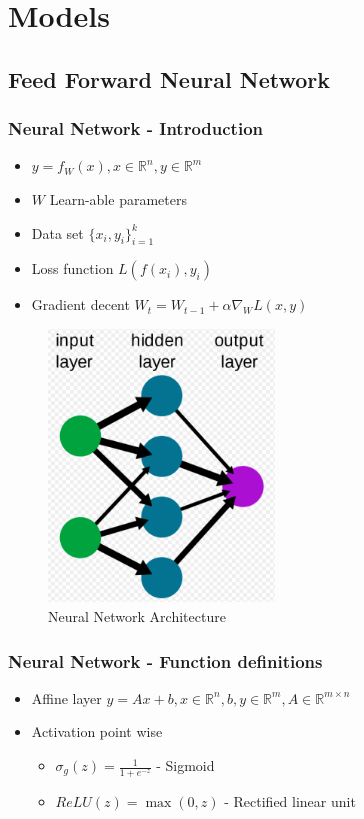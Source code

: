 \documentclass[12pt]{report}
\begin{document}
\section{Models}
\subsection{Feed Forward Neural Network}

\subsubsection{Neural Network - Introduction}
\begin{itemize}
	\item $y = f_{W}(x), x \in \mathbb{R}^n, y \in \mathbb{R}^m$ 
	\item $W$ Learn-able parameters
	\item Data set $\{x_i, y_i \}_{i=1}^k$
	\item Loss function $L(f(x_i), y_i)$
	\item Gradient decent $W_t = W_{t-1} + \alpha \nabla_{W}L(x,y) $ 
\end{itemize}

\begin{figure}[H]\centering\includegraphics[width=6cm]{FFNN.png}\caption{Neural Network Architecture}\end{figure}

\newpage
\subsubsection{Neural Network - Function definitions}
\begin{itemize}
	\item Affine layer $y = Ax + b , x \in \mathbb{R}^n, b, y \in \mathbb{R}^m, A \in \mathbb{R}^{m \times n}$
	\item Activation point wise
	\begin{itemize}
		\item $\sigma_g(z) = \frac{1}{1+e^{-z}}$ - Sigmoid 
		\item $ReLU(z) = \max(0, z)$  - Rectified linear unit
	\end{itemize}	
\end{itemize}
\end{document}
